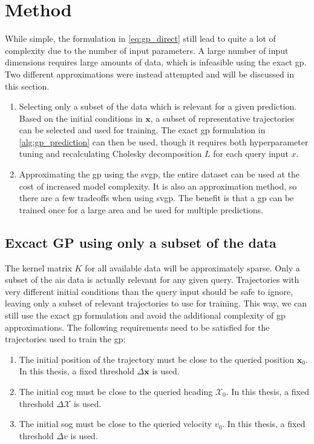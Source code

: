 \section{Method}
While simple, the formulation in \cref{eq:gp_direct} still lead to quite a lot of complexity due to the number of input parameters. A large number of input dimensions requires large amounts of data, which is infeasible using the exact \acrshort{gp}. Two different approximations were instead attempted and will be discussed in this section.

\begin{enumerate}
    \item Selecting only a subset of the data which is relevant for a given prediction. Based on the initial conditions in $\boldsymbol{x}$, a subset of representative trajectories can be selected and used for training. The exact \acrshort{gp} formulation in \cref{alg:gp_prediction} can then be used, though it requires both hyperparameter tuning and recalculating Cholesky decomposition $L$ for each query input $x$.
    \item Approximating the \acrshort{gp} using the \acrshort{svgp}, the entire dataset can be used at the cost of increased model complexity. It is also an approximation method, so there are a few tradeoffs when using \acrshort{svgp}. The benefit is that a \acrshort{gp} can be trained once for a large area and be used for multiple predictions.
\end{enumerate}

\subsection{Excact GP using only a subset of the data}
The kernel matrix $K$ for all available data will be approximately sparse. Only a subset of the \acrshort{ais} data is actually relevant for any given query. Trajectories with very different initial conditions than the query input should be safe to ignore, leaving only a subset of relevant trajectories to use for training. This way, we can still use the exact \acrshort{gp} formulation and avoid the additional complexity of \acrshort{gp} approximations. The following requirements need to be satisfied for the trajectories used to train the \acrshort{gp}:
\begin{enumerate}
    \item The initial position of the trajectory must be close to the queried position $\boldsymbol{x}_0$. In this thesis, a fixed threshold $\Delta \boldsymbol{x}$ is used.
    \item The initial \acrshort{cog} must be close to the queried heading $\mathcal{X}_0$. In this thesis, a fixed threshold $\Delta \mathcal{X}$ is used. 
    \item The initial \acrshort{sog} must be close to the queried velocity $v_0$. In this thesis, a fixed threshold $\Delta v$ is used.
\end{enumerate} 

